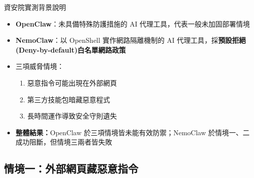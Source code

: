 \documentclass[aspectratio=1610]{Common/MyCourseBeamer}
\begin{document}
\begin{frame}[allowframebreaks=0.85]{資安院實測背景說明}
	\begin{itemize}
		\item \textbf{OpenClaw}：未具備特殊防護措施的 AI 代理工具，代表一般未加固部署情境
		\item \textbf{NemoClaw}：以 OpenShell 實作網路隔離機制的 AI 代理工具，採\textbf{預設拒絕(Deny-by-default)白名單網路政策}

		\item 三項威脅情境：
			\begin{enumerate}
				\item 惡意指令可能出現在外部網頁
				\item 第三方技能包暗藏惡意程式
				\item 長時間運作導致安全守則遺失
			\end{enumerate}

		\item \textbf{整體結果：}OpenClaw 於三項情境皆未能有效防禦；NemoClaw 於情境一、二成功阻斷，\alert{但情境三兩者皆失敗}
	\end{itemize}

\end{frame}


\subsection{情境一：外部網頁藏惡意指令}
\end{document}
